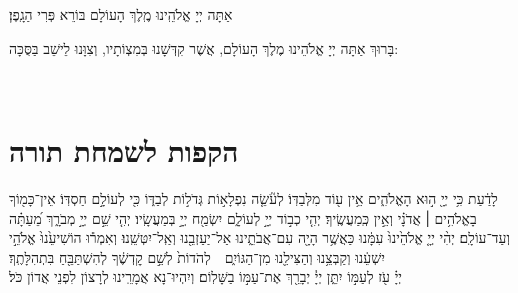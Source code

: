\documentclass[twoside, openany, parskip=half, 11pt]{book}
\begin{document}
\sepline

\savri
{}
אַתָּה יְיָ אֱלֹהֵֽינוּ מֶֽלֶךְ הָעוֹלָם בּוֹרֵא פְּרִי הַגָֽפֶן׃

\sepline

\begin{small}בָּרוּךְ אַתָּה יְיָ אֱלֹהֵינוּ מֶלֶךְ הָעוֹלָם, אֲשֶׁר קִדְּשָׁנוּ בְּמִצְוֹתָיו, וְצִוָּנוּ לֵישֵׁב בַּסֻּכָּה:\end{small} \\


\chapter[הקפות לשמחת תורה]{ הקפות לשמחת תורה }

לָדַ֔עַת כִּ֥י יְיָ֖ ה֣וּא הָאֱלֹהִ֑ים אֵ֥ין ע֖וֹד מִלְּבַדּֽוֹ׃ \hfill \break
לְעֹ֘שֵׂ֤ה נִפְלָא֣וֹת גְּדֹל֣וֹת לְבַדּ֑וֹ כִּ֖י לְעוֹלָ֣ם חַסְדּֽוֹ׃ \hfill \break
אֵין־כָּמ֖וֹךָ  בָאֱלֹהִ֥ים ׀ אֲדֹנָ֗י וְאֵ֣ין כְּֽמַעֲשֶֽׂיךָ׃  \hfill \break
יְהִ֤י כְב֣וֹד יְיָ֣ לְעוֹלָ֑ם יִשְׂמַ֖ח יְיָ֣ בְּמַעֲשָֽׂיו׃  \hfill \break
יְהִ֤י שֵׁ֣ם יְיָ֣ מְבֹרָ֑ךְ מֵ֝עַתָּ֗ה וְעַד־עוֹלָֽם׃  \hfill \break
יְהִ֨י  יְיָ֤ אֱלֹהֵ֙ינוּ֙ עִמָּ֔נוּ כַּאֲשֶׁ֥ר הָיָ֖ה עִם־אֲבֹתֵ֑ינוּ אַל־יַעַזְבֵ֖נוּ וְאַֽל־יִטְּשֵֽׁנוּ׃ \hfill \break
וְאִמְר֕וּ  הוֹשִׁיעֵ֙נוּ֙ אֱלֹהֵ֣י יִשְׁעֵ֔נוּ וְקַבְּצֵ֥נוּ וְהַצִּילֵ֖נוּ מִן־הַגּוֹיִ֑ם לְהֹדוֹת֙ לְשֵׁ֣ם קׇדְשֶׁ֔ךָ לְהִשְׁתַּבֵּ֖חַ בִּתְהִלָּתֶֽךָ׃\\
\melekhmalakhyimlokh \hfill \break
יְיָ֗ עֹ֖ז לְעַמּ֣וֹ יִתֵּ֑ן יְיָ֓ יְבָרֵ֖ךְ אֶת־עַמּ֣וֹ בַשָּׁלֽוֹם׃ \hfill \break
וְיִהְיוּ־נָא אֲמָרֵֽינוּ לְרָצוֹן לִפְנֵי אֲדוֹן כֹּל׃ \hfill \break

\vspace{-1.3\baselineskip}

\\
\end{document}
